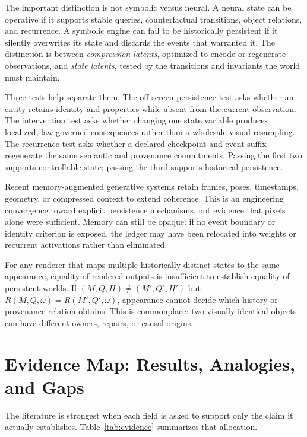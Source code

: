 \documentclass[11pt]{article}
\begin{document}
The important distinction is not symbolic versus neural. A neural state can be operative if it supports stable queries, counterfactual transitions, object relations, and recurrence. A symbolic engine can fail to be historically persistent if it silently overwrites its state and discards the events that warranted it. The distinction is between \emph{compression latents}, optimized to encode or regenerate observations, and \emph{state latents}, tested by the transitions and invariants the world must maintain.

Three tests help separate them. The off-screen persistence test asks whether an entity retains identity and properties while absent from the current observation. The intervention test asks whether changing one state variable produces localized, law-governed consequences rather than a wholesale visual resampling. The recurrence test asks whether a declared checkpoint and event suffix regenerate the same semantic and provenance commitments. Passing the first two supports controllable state; passing the third supports historical persistence.

Recent memory-augmented generative systems retain frames, poses, timestamps, geometry, or compressed context to extend coherence. This is an engineering convergence toward explicit persistence mechanisms, not evidence that pixels alone were sufficient. Memory can still be opaque: if no event boundary or identity criterion is exposed, the ledger may have been relocated into weights or recurrent activations rather than eliminated.

For any renderer that maps multiple historically distinct states to the same appearance, equality of rendered outputs is insufficient to establish equality of persistent worlds. If $(M,Q,H)\neq(M',Q',H')$ but $R(M,Q,\omega)=R(M',Q',\omega)$, appearance cannot decide which history or provenance relation obtains. This is commonplace: two visually identical objects can have different owners, repairs, or causal origins.

\section{Evidence Map: Results, Analogies, and Gaps}

The literature is strongest when each field is asked to support only the claim it actually establishes. Table~\ref{tab:evidence} summarizes that allocation.
\end{document}
